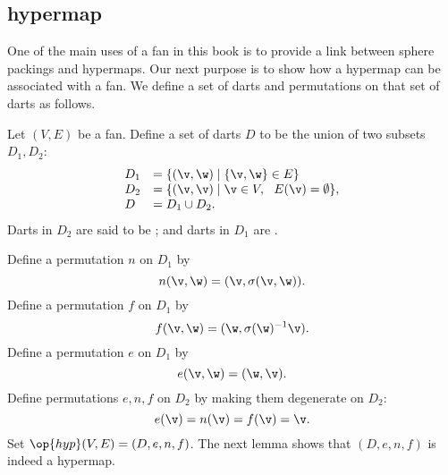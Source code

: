 \subsection{hypermap}
One of the main uses of a fan in this book is to provide a link between sphere
packings and hypermaps.  Our next purpose is to show how a hypermap can be associated
with a fan.   We define a set of darts and permutations on that set of darts as follows.

Let $(V,E)$ be a fan.  Define a set of darts $D$ to be the union of
two subsets $D_1,D_2$:
\begin{displaymath}
\begin{array}{lll}
D_1 &= \{(\v,\w)\mid \{\v,\w\}\in E\}\\
D_2 &= \{(\v,\v) \mid \v\in V,\ \ E(\v) = \emptyset\},\\
D   &= D_1\cup D_2.
\end{array}
\end{displaymath}
Darts in $D_2$ are said to be ; and darts in
$D_1$ are .
%
%
%
%
%
%
%

Define a permutation $n$ on $D_1$ by
\begin{displaymath}n(\v,\w) = (\v,\sigma(\v,\w)).\end{displaymath}
Define a permutation $f$ on $D_1$ by
\begin{displaymath}
f (\v,\w) = (\w,\sigma(\w)^{-1} \v).
\end{displaymath}
Define a permutation $e$ on $D_1$ by
\begin{displaymath}
e (\v,\w) = (\w,\v).
\end{displaymath}
Define permutations $e,n,f$ on $D_2$ by making them degenerate on $D_2$:
\begin{displaymath}
e (\v) = n(\v) = f(\v) = \v.
\end{displaymath}
Set %
$\op{hyp}(V,E)=(D,e,n,f)$. %
The next lemma shows that $(D,e,n,f)$ is indeed a hypermap.



